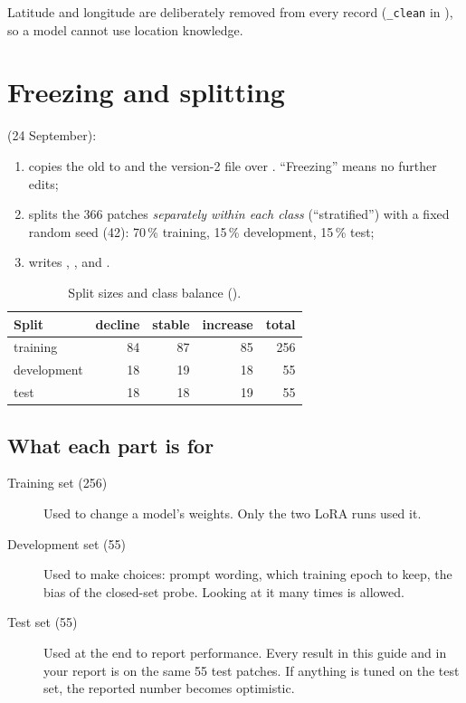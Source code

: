 Latitude and longitude are deliberately removed from every record (\texttt{\_clean} in ), so a model cannot use location knowledge.

\section{Freezing and splitting}

 (24 September):
\begin{enumerate}
  \item copies the old  to  and the version-2 file over . ``Freezing'' means no further edits;
  \item splits the 366 patches \emph{separately within each class} (``stratified'') with a fixed random seed (42): 70\,\% training, 15\,\% development, 15\,\% test;
  \item writes , ,  and .
\end{enumerate}

\begin{table}[H]
\centering
\caption{Split sizes and class balance ().}
\label{tab:split}
\begin{tabular}{lrrrr}
\toprule
Split & decline & stable & increase & total \\
\midrule
training & 84 & 87 & 85 & 256 \\
development & 18 & 19 & 18 & 55 \\
test & 18 & 18 & 19 & 55 \\
\bottomrule
\end{tabular}
\end{table}

\subsection{What each part is for}

\begin{description}
  \item[Training set (256)] Used to change a model's weights. Only the two LoRA runs used it.
  \item[Development set (55)] Used to make choices: prompt wording, which training epoch to keep, the bias of the closed-set probe. Looking at it many times is allowed.
  \item[Test set (55)] Used at the end to report performance. Every result in this guide and in your report is on the same 55 test patches. If anything is tuned on the test set, the reported number becomes optimistic.
\end{description}

